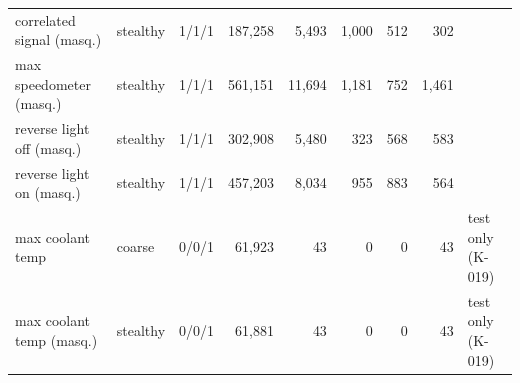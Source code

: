 \begin{table}[t]
\begin{tabular}{@{}llrrrrrrl@{}}
correlated signal (masq.) & stealthy & 1/1/1 & 187,258 & 5,493 & 1,000 & 512 & 302 &  \\
max speedometer (masq.) & stealthy & 1/1/1 & 561,151 & 11,694 & 1,181 & 752 & 1,461 &  \\
reverse light off (masq.) & stealthy & 1/1/1 & 302,908 & 5,480 & 323 & 568 & 583 &  \\
reverse light on (masq.) & stealthy & 1/1/1 & 457,203 & 8,034 & 955 & 883 & 564 &  \\
max coolant temp & coarse & 0/0/1 & 61,923 & 43 & 0 & 0 & 43 & test only (K-019) \\
max coolant temp (masq.) & stealthy & 0/0/1 & 61,881 & 43 & 0 & 0 & 43 & test only (K-019) \\
\bottomrule
\end{tabular}
\end{table}
